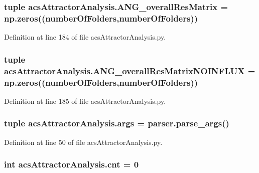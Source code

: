 \hypertarget{a00091_a43a783e7bdb1094aa477c438bd67259f}{
\subsubsection[{A\-N\-G\-\_\-overall\-Res\-Matrix}]{\setlength{\rightskip}{0pt plus 5cm}tuple acs\-Attractor\-Analysis.\-A\-N\-G\-\_\-overall\-Res\-Matrix = np.\-zeros(({\bf number\-Of\-Folders},{\bf number\-Of\-Folders}))}}\label{a00091_a43a783e7bdb1094aa477c438bd67259f}


Definition at line 184 of file acs\-Attractor\-Analysis.\-py.

\hypertarget{a00091_a0d0e0ed8583e4aa041fa6c122324311e}{
\subsubsection[{A\-N\-G\-\_\-overall\-Res\-Matrix\-N\-O\-I\-N\-F\-L\-U\-X}]{\setlength{\rightskip}{0pt plus 5cm}tuple acs\-Attractor\-Analysis.\-A\-N\-G\-\_\-overall\-Res\-Matrix\-N\-O\-I\-N\-F\-L\-U\-X = np.\-zeros(({\bf number\-Of\-Folders},{\bf number\-Of\-Folders}))}}\label{a00091_a0d0e0ed8583e4aa041fa6c122324311e}


Definition at line 185 of file acs\-Attractor\-Analysis.\-py.

\hypertarget{a00091_a750e66218ca39f0949f2f92e89136e37}{
\subsubsection[{args}]{\setlength{\rightskip}{0pt plus 5cm}tuple acs\-Attractor\-Analysis.\-args = parser.\-parse\-\_\-args()}}\label{a00091_a750e66218ca39f0949f2f92e89136e37}


Definition at line 50 of file acs\-Attractor\-Analysis.\-py.

\hypertarget{a00091_a8ec106a228fafb4c290946a7b7f8b6da}{
\subsubsection[{cnt}]{\setlength{\rightskip}{0pt plus 5cm}int acs\-Attractor\-Analysis.\-cnt = 0}}\label{a00091_a8ec106a228fafb4c290946a7b7f8b6da}


